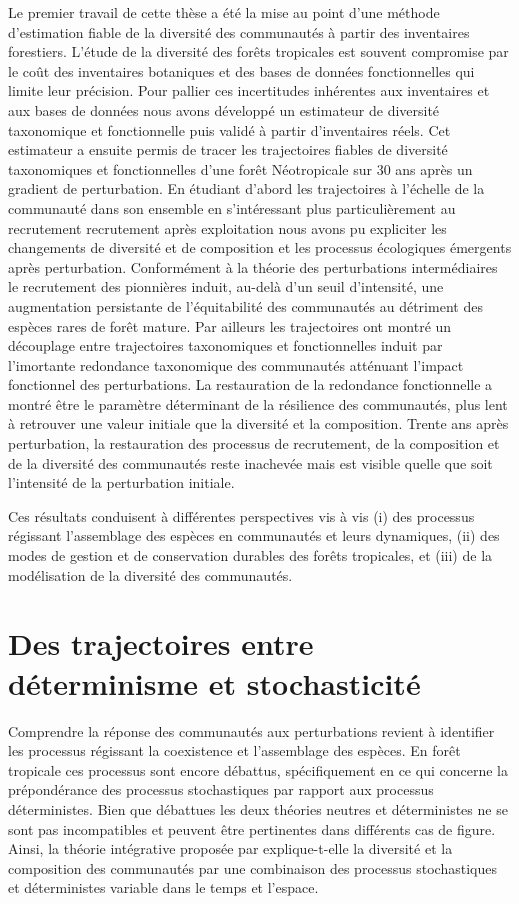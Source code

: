 \documentclass[
  11pt,
  french,
  A4paper,
  extrafontsizes,onecolumn,openright
  ]{memoir}
\begin{document}
Le premier travail de cette thèse a été la mise au point d'une méthode
d'estimation fiable de la diversité des communautés à partir des
inventaires forestiers. L'étude de la diversité des forêts tropicales
est souvent compromise par le coût des inventaires botaniques et des
bases de données fonctionnelles qui limite leur précision. Pour pallier
ces incertitudes inhérentes aux inventaires et aux bases de données nous
avons développé un estimateur de diversité taxonomique et fonctionnelle
puis validé à partir d'inventaires réels. Cet estimateur a ensuite
permis de tracer les trajectoires fiables de diversité taxonomiques et
fonctionnelles d'une forêt Néotropicale sur 30 ans après un gradient de
perturbation. En étudiant d'abord les trajectoires à l'échelle de la
communauté dans son ensemble en s'intéressant plus particulièrement au
recrutement recrutement après exploitation nous avons pu expliciter les
changements de diversité et de composition et les processus écologiques
émergents après perturbation. Conformément à la théorie des
perturbations intermédiaires le recrutement des pionnières induit,
au-delà d'un seuil d'intensité, une augmentation persistante de
l'équitabilité des communautés au détriment des espèces rares de forêt
mature. Par ailleurs les trajectoires ont montré un découplage entre
trajectoires taxonomiques et fonctionnelles induit par l'imortante
redondance taxonomique des communautés atténuant l'impact fonctionnel
des perturbations. La restauration de la redondance fonctionnelle a
montré être le paramètre déterminant de la résilience des communautés,
plus lent à retrouver une valeur initiale que la diversité et la
composition. Trente ans après perturbation, la restauration des
processus de recrutement, de la composition et de la diversité des
communautés reste inachevée mais est visible quelle que soit l'intensité
de la perturbation initiale.

Ces résultats conduisent à différentes perspectives vis à vis (i) des
processus régissant l'assemblage des espèces en communautés et leurs
dynamiques, (ii) des modes de gestion et de conservation durables des
forêts tropicales, et (iii) de la modélisation de la diversité des
communautés.

\section{Des trajectoires entre déterminisme et
stochasticité}\label{des-trajectoires-entre-determinisme-et-stochasticite}

Comprendre la réponse des communautés aux perturbations revient à
identifier les processus régissant la coexistence et l'assemblage des
espèces. En forêt tropicale ces processus sont encore débattus,
spécifiquement en ce qui concerne la prépondérance des processus
stochastiques par rapport aux processus déterministes. Bien que
débattues les deux théories neutres et déterministes ne se sont pas
incompatibles et peuvent être pertinentes dans différents cas de figure.
Ainsi, la théorie intégrative proposée par \textcite{Chave2004}
explique-t-elle la diversité et la composition des communautés par une
combinaison des processus stochastiques et déterministes variable dans
le temps et l'espace.
\end{document}
